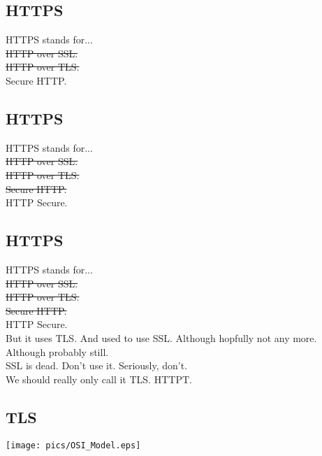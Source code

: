 \documentclass[xga]{xdvislides}
\begin{document}
\subsection{HTTPS}
HTTPS stands for... \\

\sout{HTTP over SSL.} \\

\sout{HTTP over TLS.} \\

Secure HTTP.

\subsection{HTTPS}
HTTPS stands for... \\

\sout{HTTP over SSL.} \\

\sout{HTTP over TLS.} \\

\sout{Secure HTTP.} \\

HTTP Secure.

\subsection{HTTPS}
HTTPS stands for... \\

\sout{HTTP over SSL.} \\

\sout{HTTP over TLS.} \\

\sout{Secure HTTP.} \\

HTTP Secure. \\

But it uses TLS.  And used to use SSL. Although
hopfully not any more.  Although probably still. \\

SSL is dead.  Don't use it.  Seriously, don't. \\

We should really only call it TLS.  HTTPT.

\subsection{TLS}
\begin{center}
	\texttt{[image: pics/OSI\_Model.eps]}
\end{center}
\end{document}
